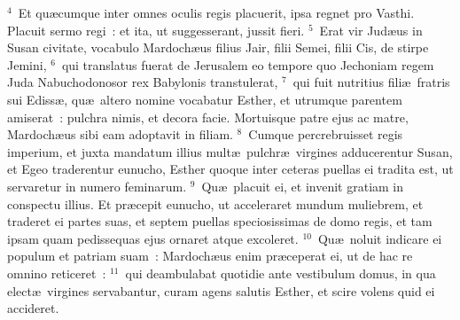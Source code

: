 ${}^{4}$~Et qu\ae cumque inter omnes oculis regis placuerit, ipsa regnet pro Vasthi. Placuit sermo regi~: et ita, ut suggesserant, jussit fieri.
${}^{5}$~Erat vir Jud\ae us in Susan civitate, vocabulo Mardoch\ae us filius Jair, filii Semei, filii Cis, de stirpe Jemini,
${}^{6}$~qui translatus fuerat de Jerusalem eo tempore quo Jechoniam regem Juda Nabuchodonosor rex Babylonis transtulerat,
${}^{7}$~qui fuit nutritius fili\ae\ fratris sui Ediss\ae , qu\ae\ altero nomine vocabatur Esther, et utrumque parentem amiserat~: pulchra nimis, et decora facie. Mortuisque patre ejus ac matre, Mardoch\ae us sibi eam adoptavit in filiam.
${}^{8}$~Cumque percrebruisset regis imperium, et juxta mandatum illius mult\ae\ pulchr\ae\ virgines adducerentur Susan, et Egeo traderentur eunucho, Esther quoque inter ceteras puellas ei tradita est, ut servaretur in numero feminarum.
${}^{9}$~Qu\ae\ placuit ei, et invenit gratiam in conspectu illius. Et pr\ae cepit eunucho, ut acceleraret mundum muliebrem, et traderet ei partes suas, et septem puellas speciosissimas de domo regis, et tam ipsam quam pedissequas ejus ornaret atque excoleret.
${}^{10}$~Qu\ae\ noluit indicare ei populum et patriam suam~: Mardoch\ae us enim pr\ae ceperat ei, ut de hac re omnino reticeret~:
${}^{11}$~qui deambulabat quotidie ante vestibulum domus, in qua elect\ae\ virgines servabantur, curam agens salutis Esther, et scire volens quid ei accideret.


